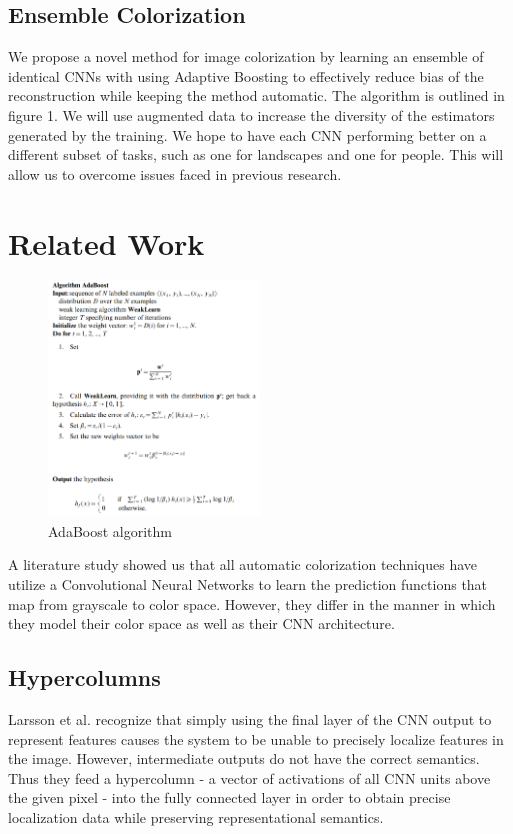 \documentclass[10pt,twocolumn,letterpaper]{article}
\begin{document}
\subsection{Ensemble Colorization}
We propose a novel method for image colorization by learning an ensemble of identical CNNs with using Adaptive Boosting to effectively reduce bias of the reconstruction while keeping the method automatic. The algorithm is outlined in figure 1. We will use augmented data to increase the diversity of the estimators generated by the training. We hope to have each CNN performing better on a different subset of tasks, such as one for landscapes and one for people. This will allow us to overcome issues faced in previous research.

\section{Related Work}
\begin{figure}
  \centering
    \includegraphics[width=0.5\textwidth]{images/AdaBoost}
  \caption{AdaBoost algorithm \cite{freund1995}}
\end{figure}

A literature study showed us that all automatic colorization techniques
have utilize a Convolutional Neural Networks to learn the prediction functions that map from grayscale to color space. However, they differ in the manner in which they model their color space as well as their CNN architecture.

\subsection{Hypercolumns}
Larsson et al.\cite{Larsson2016} recognize that simply using the final layer of the CNN output to represent features causes the system to be unable to precisely localize features in the image. However, intermediate outputs do not have the correct semantics. Thus they feed a hypercolumn\cite{Hariharan2015} - a vector of activations of all CNN units above the given pixel - into the fully connected layer in order to obtain precise localization data while preserving representational semantics.
\end{document}
